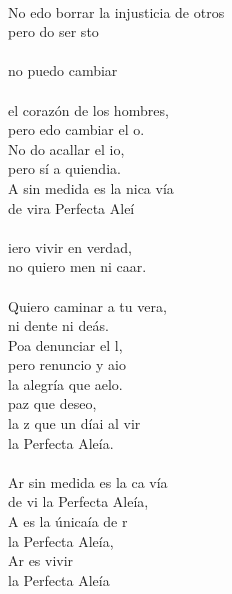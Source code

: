 \begin{cancion}%
	   \chord{(}{**)}{    }\\
	No edo borrar la injusticia de otros\\
	pero do ser sto \\
	\jump\\
no puedo cambiar \\
	\jump\\
el corazón de los hombres, \\
	pero edo cambiar el o. \\
	No do acallar el io, \\
	pero sí  a quiendia.\\
	A sin medida es la nica vía \\
	de vira Perfecta Aleí  \chord{(}{**)}{    }\\
	\jump\\
	iero vivir en verdad, \\
	no quiero men ni caar.\\
	\jump\\
Quiero caminar a tu vera,\\
	ni dente ni deás.\\
	Poa denunciar el l,  \\
	pero renuncio y aio \\
	la alegría que aelo.\\
	paz que deseo, \\
	la z que un díai al vir\\
	la Perfecta Aleía.   \chord{(}{**)}{    }\\
	\jump\\
	Ar sin medida es la ca vía \\
	de vi la Perfecta Aleía,\\
	A es la únicaía de r \\
	la Perfecta Aleía,\\
	Ar es vivir  \\
	la Perfecta Aleía  \chord{(}{**)}{    }\\
\end{cancion}%
